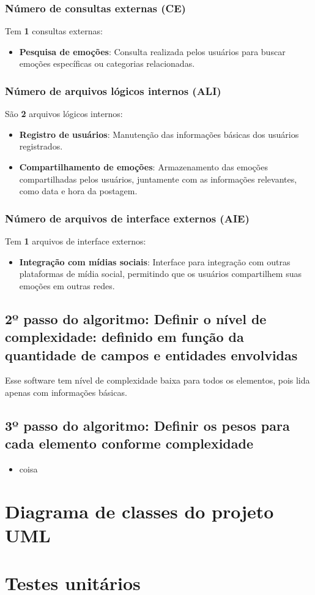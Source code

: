 \documentclass[12pt]{article}
\begin{document}
\subsubsection{Número de consultas externas (CE)}
  Tem \textbf{1} consultas externas:
  \begin{itemize}
    \item \textbf{Pesquisa de emoções}: Consulta realizada pelos usuários para buscar emoções específicas ou categorias relacionadas.
  \end{itemize}
\subsubsection{Número de arquivos lógicos internos (ALI)}
  São \textbf{2} arquivos lógicos internos:
  \begin{itemize}
    \item \textbf{Registro de usuários}: Manutenção das informações básicas dos usuários registrados.
    \item \textbf{Compartilhamento de emoções}: Armazenamento das emoções compartilhadas pelos usuários, juntamente com as informações relevantes, como data e hora da postagem.
  \end{itemize}
\subsubsection{Número de arquivos de interface externos (AIE)}
  Tem \textbf{1} arquivos de interface externos:
    \begin{itemize}
      \item \textbf{Integração com mídias sociais}: Interface para integração com outras plataformas de mídia social, permitindo que os usuários compartilhem suas emoções em outras redes.
    \end{itemize}
\subsection{2º passo do algoritmo: Definir o nível de complexidade: definido em função da quantidade de campos e entidades envolvidas}
    Esse software tem nível de complexidade baixa para todos os elementos, pois lida apenas com informações básicas.
\subsection{3º passo do algoritmo: Definir os pesos para cada elemento conforme complexidade}
    \begin{itemize}
      \item coisa
    \end{itemize}


\section{Diagrama de classes do projeto UML}


\section{Testes unitários}





\end{document}
